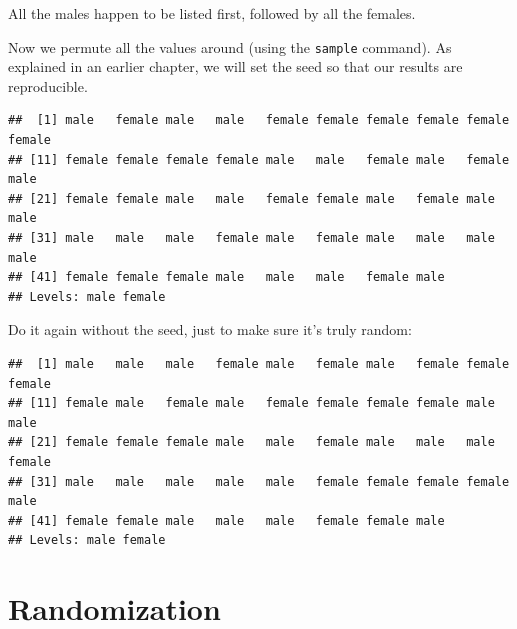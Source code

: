 \documentclass[
]{book}
\newenvironment{Shaded}{\begin{snugshade}}{\end{snugshade}}
\newcommand{\DecValTok}[1]{\textcolor[rgb]{0.00,0.00,0.81}{#1}}
\newcommand{\FunctionTok}[1]{\textcolor[rgb]{0.00,0.00,0.00}{#1}}
\newcommand{\NormalTok}[1]{#1}
\newcommand{\SpecialCharTok}[1]{\textcolor[rgb]{0.00,0.00,0.00}{#1}}
\begin{document}
All the males happen to be listed first, followed by all the females.

Now we permute all the values around (using the \texttt{sample} command). As explained in an earlier chapter, we will set the seed so that our results are reproducible.

\begin{Shaded}
\end{Shaded}

\begin{verbatim}
##  [1] male   female male   male   female female female female female female
## [11] female female female female male   male   female male   female male  
## [21] female female male   male   female female male   female male   male  
## [31] male   male   male   female male   female male   male   male   male  
## [41] female female female male   male   male   female male  
## Levels: male female
\end{verbatim}

Do it again without the seed, just to make sure it's truly random:

\begin{Shaded}
\end{Shaded}

\begin{verbatim}
##  [1] male   male   male   female male   female male   female female female
## [11] female male   female male   female female female female male   male  
## [21] female female female male   male   female male   male   male   female
## [31] male   male   male   male   male   female female female female male  
## [41] female female male   male   male   female female male  
## Levels: male female
\end{verbatim}

\hypertarget{randomization2-randomization}{%
\section{Randomization}\label{randomization2-randomization}}
\end{document}
